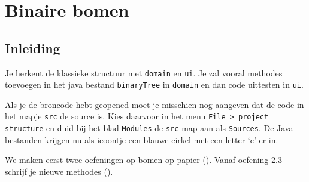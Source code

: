 \chapter{Binaire bomen}

\section*{Inleiding}


Je herkent de klassieke structuur met \verb+domain+ en \verb+ui+. Je zal vooral methodes toevoegen in het java bestand \verb=binaryTree= in \verb+domain+ en dan code uittesten in \verb+ui+.

Als je de broncode hebt geopened moet je  misschien nog aangeven dat de code in het mapje \verb+src+ de source is. Kies daarvoor in het menu \verb+File > project structure+ en duid bij het blad \verb+Modules+ de \verb+src+ map aan als \verb+Sources+. De Java bestanden krijgen nu als icoontje een blauwe cirkel met een letter ‘c’ er in.

We maken eerst twee oefeningen op bomen op papier (\papier). Vanaf oefening 2.3 schrijf je nieuwe methodes (\code).


